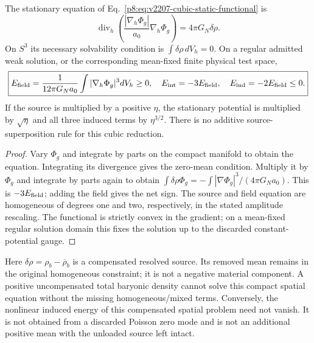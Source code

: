 \documentclass[12pt,a4paper]{article}
\begin{document}
\begin{proposition}
\label{p8:prop:v2207-cubic-compact-sign}
The stationary equation of
Eq.~\eqref{p8:eq:v2207-cubic-static-functional} is
\begin{equation}
\label{p8:eq:v2207-cubic-compact-equation}
 \boxed{\operatorname{div}_h\left(
        \frac{|\nabla_h\Phi_g|}{a_0}\nabla_h\Phi_g\right)
             =4\pi G_N\delta\rho.}
\end{equation}
On $S^3$ its necessary solvability condition is
$\int\delta\rho\,dV_h=0$. On a regular admitted weak solution, or
the corresponding mean-fixed finite physical test space,
\begin{equation}
\label{p8:eq:v2207-cubic-energy-allocation}
 \boxed{E_{\rm field}=\frac1{12\pi G_Na_0}
                    \int|\nabla_h\Phi_g|^3dV_h\ge0,
 \quad E_{\rm int}=-3E_{\rm field},
 \quad E_{\rm ind}=-2E_{\rm field}\le0.}
\end{equation}
If the source is multiplied by a positive $\eta$, the stationary potential
is multiplied by $\sqrt\eta$ and all three induced terms by $\eta^{3/2}$.
There is no additive source-superposition rule for this cubic reduction.
\end{proposition}
\begin{proof}
Vary $\Phi_g$ and integrate by parts on the compact manifold to obtain
the equation. Integrating its divergence gives the zero-mean condition.
Multiply it by $\Phi_g$ and integrate by parts again to obtain
$\int\delta\rho\Phi_g=-\int|\nabla\Phi_g|^3/(4\pi G_Na_0)$.
This is $-3E_{\rm field}$; adding the field gives the net sign.
The source and field equation are homogeneous of degrees one and two,
respectively, in the stated amplitude rescaling. The functional is
strictly convex in the gradient; on a mean-fixed regular solution domain
this fixes the solution up to the discarded constant-potential gauge.
\end{proof}

Here $\delta\rho=\rho_b-\overline\rho_b$ is a compensated resolved
source. Its removed mean remains in the original homogeneous constraint;
it is not a negative material component. A positive uncompensated total
baryonic density cannot solve this compact spatial equation without the
missing homogeneous/mixed terms. Conversely, the nonlinear induced energy
of this compensated spatial problem need not vanish. It is not obtained
from a discarded Poisson zero mode and is not an additional positive
mean with the unloaded source left intact.
\end{document}
